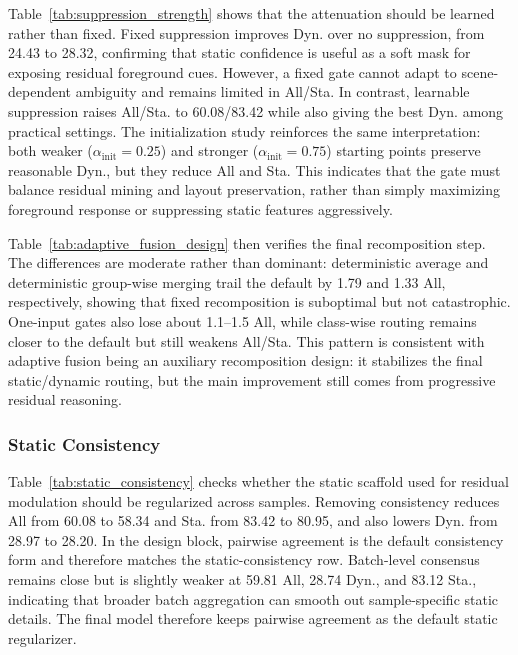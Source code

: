 Table~\ref{tab:suppression_strength} shows that the attenuation should be
learned rather than fixed. Fixed suppression improves Dyn. over no suppression,
from 24.43 to 28.32, confirming that static confidence is useful as a soft mask
for exposing residual foreground cues. However, a fixed gate cannot adapt to
scene-dependent ambiguity and remains limited in All/Sta. In contrast,
learnable suppression raises All/Sta. to 60.08/83.42 while also giving the best
Dyn. among practical settings. The initialization study reinforces the same
interpretation: both weaker ($\alpha_{\mathrm{init}}=0.25$) and stronger
($\alpha_{\mathrm{init}}=0.75$) starting points preserve reasonable Dyn., but
they reduce All and Sta. This indicates that the gate must balance residual
mining and layout preservation, rather than simply maximizing foreground
response or suppressing static features aggressively.

Table~\ref{tab:adaptive_fusion_design} then verifies the final recomposition
step. The differences are moderate rather than dominant:
deterministic average and deterministic group-wise merging trail the default by
1.79 and 1.33 All, respectively, showing that fixed recomposition is
suboptimal but not catastrophic. One-input gates also lose about 1.1--1.5 All,
while class-wise routing remains closer to the default but still weakens
All/Sta. This pattern is consistent with adaptive fusion being an auxiliary
recomposition design: it stabilizes the final static/dynamic routing, but the
main improvement still comes from progressive residual reasoning.





\subsubsection{Static Consistency}
Table~\ref{tab:static_consistency} checks whether the static scaffold used for
residual modulation should be regularized across samples. Removing consistency
reduces All from 60.08 to 58.34 and Sta. from 83.42 to 80.95, and also lowers
Dyn. from 28.97 to 28.20. In the design block, pairwise agreement is the
default consistency form and therefore matches the static-consistency row.
Batch-level consensus remains close but is slightly weaker at 59.81 All, 28.74
Dyn., and 83.12 Sta., indicating that broader batch aggregation can smooth out
sample-specific static details. The final model therefore keeps pairwise
agreement as the default static regularizer.

